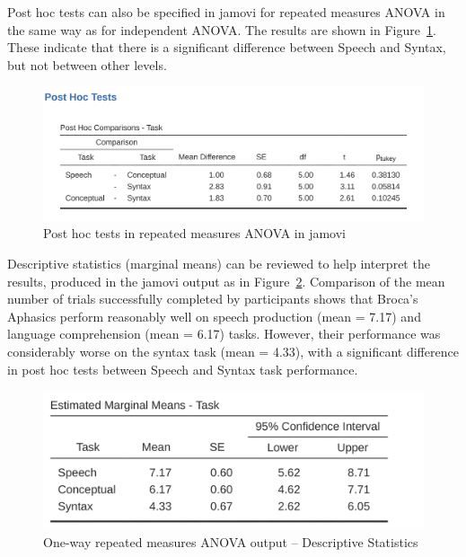 \documentclass[
  a4paper,
]{book}
\begin{document}
Post hoc tests can also be specified in jamovi for repeated measures
ANOVA in the same way as for independent ANOVA. The results are shown in
Figure~\ref{fig-fig13-12}. These indicate that there is a significant
difference between Speech and Syntax, but not between other levels.

\begin{figure}

\includegraphics[width=1\textwidth,height=\textheight]{images/fig13-12.png} \hfill{}

\caption{\label{fig-fig13-12}Post hoc tests in repeated measures ANOVA
in jamovi}

\end{figure}

Descriptive statistics (marginal means) can be reviewed to help
interpret the results, produced in the jamovi output as in
Figure~\ref{fig-fig13-13}. Comparison of the mean number of trials
successfully completed by participants shows that Broca's Aphasics
perform reasonably well on speech production (mean = 7.17) and language
comprehension (mean = 6.17) tasks. However, their performance was
considerably worse on the syntax task (mean = 4.33), with a significant
difference in post hoc tests between Speech and Syntax task performance.

\begin{figure}

\includegraphics[width=1\textwidth,height=\textheight]{images/fig13-13.png} \hfill{}

\caption{\label{fig-fig13-13}One-way repeated measures ANOVA output --
Descriptive Statistics}

\end{figure}
\end{document}
